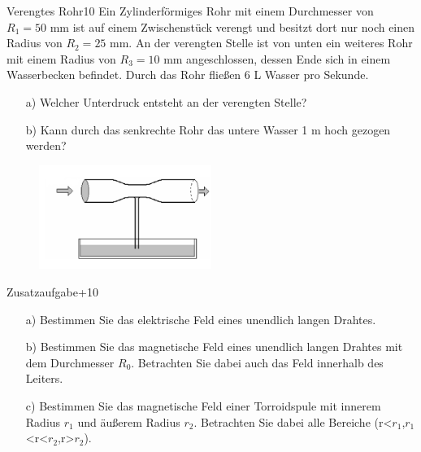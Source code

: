 \begin{exercise}{Verengtes Rohr}{10}
  Ein Zylinderförmiges Rohr mit einem Durchmesser von $R_{1}=50$ mm ist auf
  einem Zwischenstück verengt und besitzt dort nur noch einen Radius von
  $R_{2}=25$ mm. An der verengten Stelle ist von unten ein weiteres Rohr mit
  einem Radius von $R_{3}=10$ mm angeschlossen, dessen Ende sich in einem
  Wasserbecken befindet. Durch das Rohr flie\ss en 6 L Wasser pro Sekunde.

  \begin{enumerate}
    \item [a)] Welcher Unterdruck entsteht an der verengten Stelle?
    \item [b)] Kann durch das senkrechte Rohr das untere Wasser 1 m hoch gezogen
    werden?
  \end{enumerate}
\end{exercise}

\FloatBarrier

  \begin{figure}[h]
    \centering
    \includegraphics[width = 0.5\textwidth]{Rohr.jpg}
  \end{figure}



\FloatBarrier
\newpage

\begin{exercise}{Zusatzaufgabe}{+10}
  \begin{enumerate}
    \item [a)] Bestimmen Sie das elektrische Feld eines unendlich langen Drahtes.
    \item [b)] Bestimmen Sie das magnetische Feld eines unendlich langen Drahtes
               mit dem Durchmesser $R_{0}$. Betrachten Sie dabei auch das Feld
               innerhalb des Leiters.
    \item [c)] Bestimmen Sie das magnetische Feld einer Torroidspule mit innerem
               Radius $r_{1}$ und äu\ss erem Radius $r_{2}$. Betrachten Sie dabei
               alle Bereiche (r<$r_{1}$,$r_{1}$<r<$r_{2}$,r>$r_{2}$).
  \end{enumerate}
\end{exercise}
